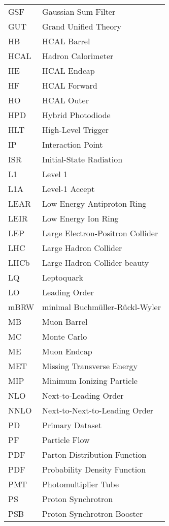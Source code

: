 \begin{longtable}[l]{@{}l@{\ \ \ \ \ \ \ \ \ \ \ \ }l}
GSF        & Gaussian Sum Filter \\
GUT        & Grand Unified Theory \\
HB         & HCAL Barrel \\
HCAL       & Hadron Calorimeter \\
HE         & HCAL Endcap \\
HF         & HCAL Forward \\
HO         & HCAL Outer \\
HPD        & Hybrid Photodiode \\
HLT        & High-Level Trigger \\
IP         & Interaction Point \\
ISR        & Initial-State Radiation \\
L1         & Level 1 \\
L1A        & Level-1 Accept \\
LEAR       & Low Energy Antiproton Ring \\
LEIR       & Low Energy Ion Ring \\
LEP        & Large Electron-Positron Collider \\
LHC        & Large Hadron Collider \\
LHCb       & Large Hadron Collider beauty \\
LQ         & Leptoquark \\
LO         & Leading Order \\
mBRW       & minimal Buchm\"{u}ller-R\"{u}ckl-Wyler \\
MB         & Muon Barrel \\
MC         & Monte Carlo \\
ME         & Muon Endcap \\
MET        & Missing Transverse Energy \\
MIP        & Minimum Ionizing Particle \\
NLO        & Next-to-Leading Order \\
NNLO       & Next-to-Next-to-Leading Order \\
PD         & Primary Dataset \\
PF         & Particle Flow \\
PDF        & Parton Distribution Function \\
PDF        & Probability Density Function \\
PMT        & Photomultiplier Tube \\
PS         & Proton Synchrotron \\
PSB        & Proton Synchrotron Booster \\

\end{longtable}
